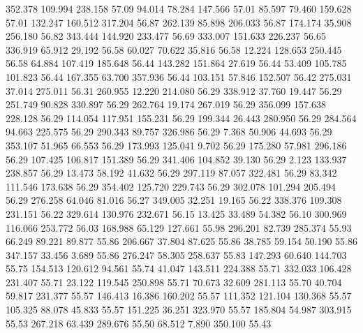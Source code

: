  352.378  109.994  238.158        57.09
  94.014   78.284  147.566        57.01
  85.597   79.460  159.628        57.01
 132.247  160.512  317.204        56.87
 262.139   85.898  206.033        56.87
 174.174   35.908  256.180        56.82
 343.444  144.920  233.477        56.69
 333.007  151.633  226.237        56.65
 336.919   65.912   29.192        56.58
  60.027   70.622   35.816        56.58
  12.224  128.653  250.445        56.58
  64.884  107.419  185.648        56.44
 143.282  151.864   27.619        56.44
  53.409  105.785  101.823        56.44
 167.355   63.700  357.936        56.44
 103.151   57.846  152.507        56.42
 275.031   37.014  275.011        56.31
 260.955   12.220  214.080        56.29
 338.912   37.760   19.447        56.29
 251.749   90.828  330.897        56.29
 262.764   19.174  267.019        56.29
 356.099  157.638  228.128        56.29
 114.054  117.951  155.231        56.29
 199.344   26.443  280.950        56.29
 284.564   94.663  225.575        56.29
 290.343   89.757  326.986        56.29
   7.368   50.906   44.693        56.29
 353.107   51.965   66.553        56.29
 173.993  125.041    9.702        56.29
 175.280   57.981  296.186        56.29
 107.425  106.817  151.389        56.29
 341.406  104.852   39.130        56.29
   2.123  133.937  238.857        56.29
  13.473   58.192   41.632        56.29
 297.119   87.057  322.481        56.29
  83.342  111.546  173.638        56.29
 354.402  125.720  229.743        56.29
 302.078  101.294  205.494        56.29
 276.258   64.046   81.016        56.27
 349.005   32.251   19.165        56.22
 338.376  109.308  231.151        56.22
 329.614  130.976  232.671        56.15
  13.425   33.489   54.382        56.10
 300.969  116.066  253.772        56.03
 168.988   65.129  127.661        55.98
 296.201   82.739  285.374        55.93
  66.249   89.221   89.877        55.86
 206.667   37.804   87.625        55.86
  38.785   59.154   50.190        55.86
 347.157   33.456    3.689        55.86
 276.247   58.305  258.637        55.83
 147.293   60.640  144.703        55.75
 154.513  120.612   94.561        55.74
  41.047  143.511  224.388        55.71
 332.033  106.428  231.407        55.71
  23.122  119.545  250.898        55.71
  70.673   32.609  281.113        55.70
  40.704   59.817  231.377        55.57
 146.413   16.386  160.202        55.57
 111.352  121.104  130.368        55.57
 105.325   88.078   45.833        55.57
 151.225   36.251  323.970        55.57
 185.804   54.987  303.915        55.53
 267.218   63.439  289.676        55.50
  68.512    7.890  350.100        55.43
